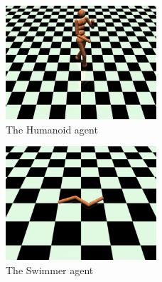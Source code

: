 \begin{figure}[H]
	\includegraphics[width=0.5\textwidth]{images/agent_humanoid.png}
	\centering
	\caption{The Humanoid agent}\label{fig_agent_humanoid}
\end{figure}
\begin{figure}[H]
	\includegraphics[width=0.5\textwidth]{images/agent_swimmer.png}
	\centering
	\caption{The Swimmer agent}\label{fig_agent_swimmer}
\end{figure}



